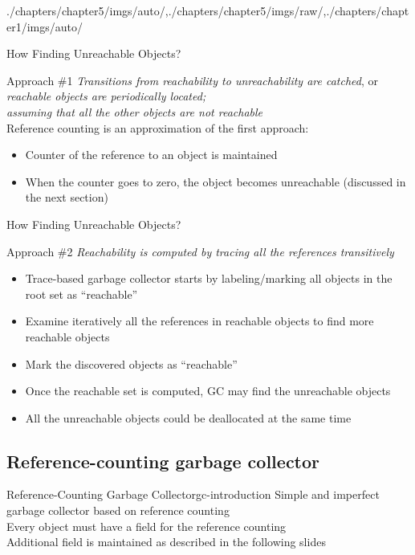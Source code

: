 \begin{graphicspathcontext}{{./chapters/chapter5/imgs/auto/},{./chapters/chapter5/imgs/raw/},{./chapters/chapter1/imgs/auto/}}
\begin{bibunit}[apalike]
\begin{frame}{{How Finding} Unreachable Objects?}
	\begin{block}{Approach \#1}
		\emph{Transitions from reachability to unreachability are catched}, or \\
		\emph{reachable objects are periodically located;} \\
		\emph{assuming that all the other objects are not reachable} \\[.5cm]
		Reference counting is an approximation of the first approach:
		\begin{itemize}
			\item Counter of the reference to an object is maintained
			\item When the counter goes to zero, the object becomes unreachable (discussed in the next section)
		\end{itemize}
	\end{block}
\end{frame}

\begin{frame}{{How Finding} Unreachable Objects? \insertcontinuationtext}
	\begin{block}{Approach \#2}
		\emph{Reachability is computed by tracing all the references transitively} \\[.5cm]
		\begin{itemize}
			\item Trace-based garbage collector starts by labeling/marking all objects in the root set as ``reachable''
			\item Examine iteratively all the references in reachable objects to find more reachable objects
			\item Mark the discovered objects as ``reachable''
			\item Once the reachable set is computed, GC may find the unreachable objects
			\item All the unreachable objects could be deallocated at the same time
		\end{itemize}
	\end{block}
\end{frame}

\subsection{Reference-counting garbage collector}
\subsectiontableofcontentslide

\begin{leftlawnframe}{Reference-Counting Garbage Collector}{gc-introduction}
	Simple and imperfect garbage collector based on reference counting \\[1cm]
	Every object must have a field for the reference counting \\
	Additional field is maintained as described in the following slides
\end{leftlawnframe}


\end{bibunit}
\end{graphicspathcontext}
